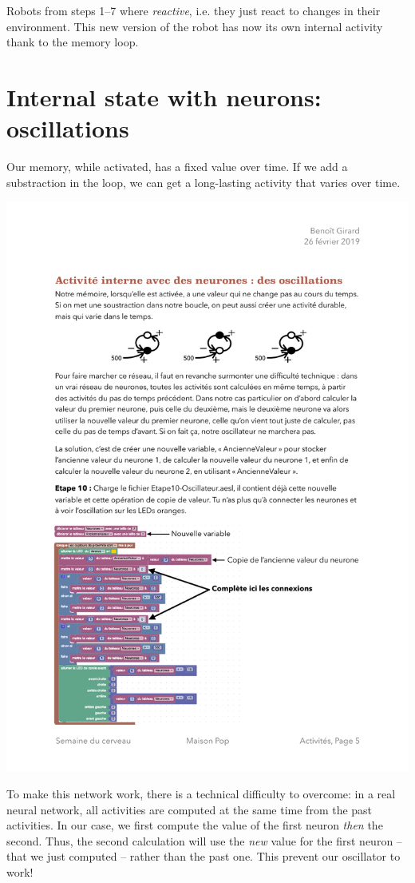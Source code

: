 \documentclass[12pt]{article}
\begin{document}
Robots from steps 1--7 where \emph{reactive}, i.e. they just react to changes in their environment. This new version of the robot has now its own internal activity thank to the memory loop.

\section{Internal state with neurons: oscillations}

Our memory, while activated, has a fixed value over time. If we add a substraction in the loop, we can get a long-lasting activity that varies over time.

\includegraphics{../Oscillations.pdf}

To make this network work, there is a technical difficulty to overcome: in a real neural network, all activities are computed at the same time from the past activities. In our case, we first compute the value of the first neuron \emph{then} the second. Thus, the second calculation will use the \emph{new} value for the first neuron -- that we just computed -- rather than the past one. This prevent our oscillator to work!
\end{document}
